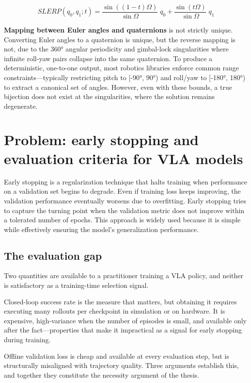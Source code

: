 \documentclass[english,12pt,a4paper,pdftex,elec,utf8]{aaltothesis}
\begin{document}
$$S L E R P(q_{0},q_{1};t)={\frac{\sin((1-t)\Omega)}{\sin\Omega}}\;q_{0}+{\frac{\sin(t\Omega)}{\sin\Omega}}\;q_{1}$$

\textbf{Mapping between Euler angles and quaternions} is not strictly unique. Converting Euler angles to a quaternion is unique, but the reverse mapping is not, due to the 360° angular periodicity and gimbal-lock singularities where infinite roll-yaw pairs collapse into the same quaternion. To produce a deterministic, one-to-one output, most robotics libraries enforce common range constraints—typically restricting pitch to [-90°, 90°) and roll/yaw to [-180°, 180°) to extract a canonical set of angles. However, even with these bounds, a true bijection does not exist at the singularities, where the solution remains degenerate.



\clearpage

\section{Problem: early stopping and evaluation criteria for VLA models}
\label{sec:eval}

Early stopping is a regularization technique that halts training when performance on a validation set begins to degrade. Even if training loss keeps improving, the validation performance eventually worsens due to overfitting. Early stopping tries to capture the turning point when the validation metric does not improve within a tolerated number of epochs. This approach is widely used because it is simple while effectively ensuring the model's generalization performance. 

\subsection{The evaluation gap}
\label{subsec:eval-gap}

Two quantities are available to a practitioner training a VLA policy, and neither is satisfactory as a training-time selection signal.

Closed-loop success rate is the measure that matters, but obtaining it requires executing many rollouts per checkpoint in simulation or on hardware. It is expensive, high-variance when the number of episodes is small, and available only after the fact---properties that make it impractical as a signal for early
stopping during training.

Offline validation loss is cheap and available at every evaluation step, but is structurally misaligned with trajectory quality. Three arguments establish this, and together they constitute the necessity argument of the thesis.
\end{document}
